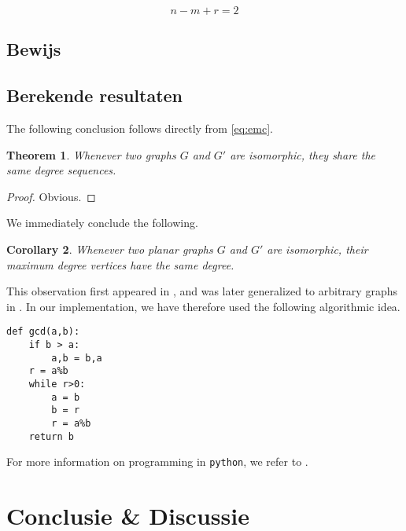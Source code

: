 \documentclass[twoside]{article}
\newtheorem{theorem}{Theorem}[section]
\newtheorem{corollary}[theorem]{Corollary}
\begin{document}
\begin{multicols}{2}
\begin{equation}
\label{eq:emc}
n-m+r=2
\end{equation}

\subsection{Bewijs}

\subsection{Berekende resultaten}

The following conclusion follows directly from \eqref{eq:emc}.
\lipsum[6] %
\begin{theorem}
Whenever two graphs $G$ and $G'$ are isomorphic, they share the same degree sequences.
\end{theorem}
\begin{proof}
Obvious.
\end{proof}
We immediately conclude the following.
\begin{corollary}
Whenever two planar graphs $G$ and $G'$ are isomorphic, their maximum degree vertices have the same degree. 
\end{corollary}
This observation first appeared in , and was later generalized to arbitrary graphs in .
In our implementation, we have therefore used the following algorithmic idea.
\begin{verbatim}
def gcd(a,b):
    if b > a:
        a,b = b,a
    r = a%b
    while r>0:
        a = b
        b = r
        r = a%b
    return b
\end{verbatim}
For more information on programming in {\tt python}, we refer to\cite{jaco} \cite{MR0403320}.

\section{Conclusie \& Discussie}


\lipsum[8] %


 




\end{multicols}
\end{document}
